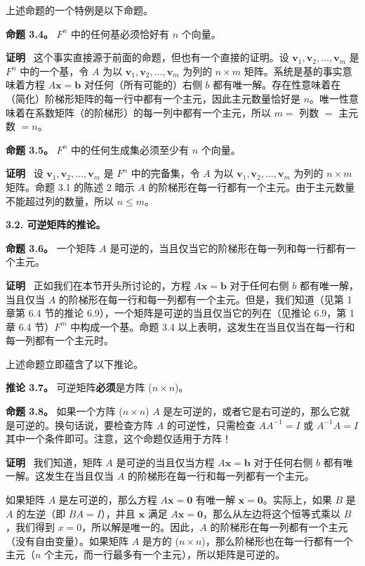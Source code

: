 上述命题的一个特例是以下命题。

\textbf{命题 3.4。} $F^n$ 中的任何基必须恰好有 $n$ 个向量。

\textbf{证明}~ 这个事实直接源于前面的命题，但也有一个直接的证明。设 $\mathbf{v}_1, \mathbf{v}_2, \dots, \mathbf{v}_m$ 是 $F^n$ 中的一个基，令 $A$ 为以 $\mathbf{v}_1, \mathbf{v}_2, \dots, \mathbf{v}_m$ 为列的 $n \times m$ 矩阵。系统是基的事实意味着方程 $A \mathbf{x} = \mathbf{b}$ 对任何（所有可能的）右侧 $b$ 都有唯一解。存在性意味着在（简化）阶梯形矩阵的每一行中都有一个主元，因此主元数量恰好是 $n$。唯一性意味着在系数矩阵（的阶梯形）的每一列中都有一个主元，所以 $m =$ 列数 $=$ 主元数 $= n$。

\textbf{命题 3.5。} $F^n$ 中的任何生成集必须至少有 $n$ 个向量。

\textbf{证明}~ 设 $\mathbf{v}_1, \mathbf{v}_2, \dots, \mathbf{v}_m$ 是 $F^n$ 中的完备集，令 $A$ 为以 $\mathbf{v}_1, \mathbf{v}_2, \dots, \mathbf{v}_m$ 为列的 $n \times m$ 矩阵。命题 3.1 的陈述 2 暗示 $A$ 的阶梯形在每一行都有一个主元。由于主元数量不能超过列的数量，所以 $n \le m$。

\textbf{3.2. 可逆矩阵的推论。}

\textbf{命题 3.6。} 一个矩阵 $A$ 是可逆的，当且仅当它的阶梯形在每一列和每一行都有一个主元。

\textbf{证明}~ 正如我们在本节开头所讨论的，方程 $A \mathbf{x} = \mathbf{b}$ 对于任何右侧 $b$ 都有唯一解，当且仅当 $A$ 的阶梯形在每一行和每一列都有一个主元。但是，我们知道（见第 1 章第 6.4 节的推论 6.9），一个矩阵是可逆的当且仅当它的列在（见推论 6.9，第 1 章 6.4 节）$F^m$ 中构成一个基。命题 3.4 以上表明，这发生在当且仅当在每一行和每一列都有一个主元时。

上述命题立即蕴含了以下推论。

\textbf{推论 3.7。} 可逆矩阵\textbf{必须}是方阵 ($n \times n$)。

\textbf{命题 3.8。} 如果一个方阵 ($n \times n$) $A$ 是左可逆的，或者它是右可逆的，那么它就是可逆的。换句话说，要检查方阵 $A$ 的可逆性，只需检查 $A A^{-1} = I$ 或 $A^{-1} A = I$ 其中一个条件即可。注意，这个命题仅适用于方阵！

\textbf{证明}~ 我们知道，矩阵 $A$ 是可逆的当且仅当方程 $A \mathbf{x} = \mathbf{b}$ 对于任何右侧 $b$ 都有唯一解。这发生在当且仅当 $A$ 的阶梯形在每一行和每一列都有一个主元。

如果矩阵 $A$ 是左可逆的，那么方程 $A \mathbf{x} = \mathbf{0}$ 有唯一解 $\mathbf{x} = \mathbf{0}$。实际上，如果 $B$ 是 $A$ 的左逆（即 $BA = I$），并且 $\mathbf{x}$ 满足 $A \mathbf{x} = \mathbf{0}$，那么从左边将这个恒等式乘以 $B$，我们得到 $x = 0$，所以解是唯一的。因此，$A$ 的阶梯形在每一列都有一个主元（没有自由变量）。如果矩阵 $A$ 是方的 ($n \times n$)，那么阶梯形也在每一行都有一个主元（$n$ 个主元，而一行最多有一个主元），所以矩阵是可逆的。

